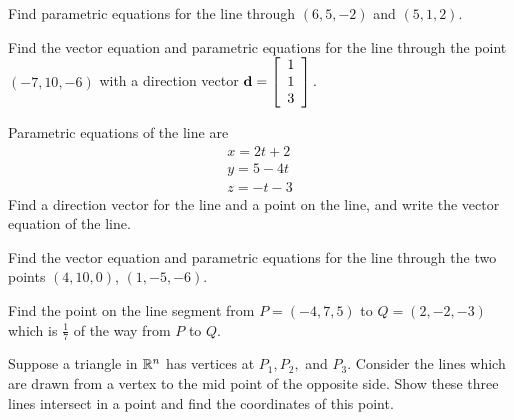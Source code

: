 \begin{enumialphparenastyle}
\begin{ex} Find parametric equations for the line through $\left( 6 , 5 , -2 \right) $ 
and $\left(5 , 1 , 2 \right) .$ 
\end{ex} 
 

\begin{ex} Find the vector equation and parametric equations for the line through the point $\left(
-7, 10 , -6 \right) $ with a direction vector ${\bf d} = \left[
\begin{array}{r}
1 \\
1 \\
3
\end{array}
\right] .$ \vspace{1mm}
\end{ex} 

\begin{ex} Parametric equations of the line are 
\begin{equation*}
\begin{array}{c}
x = 2t+2\\
y = 5-4t\\
z= -t-3
\end{array}
\end{equation*}
 Find a direction vector for the line and a point on the line, and write the 
vector equation of the line. 
\end{ex} 


\begin{ex} Find the vector equation and parametric equations for the line through the two points $\left(
4, 10, 0 \right) $, $\left( 1 , -5 , -6 \right) .$ 
\end{ex} 

\begin{ex} Find the point on the line segment from $P = \left(-4, 7, 5 \right) $
 to $Q = \left(2 , -2 , -3 \right) $ which is $\frac{1}{7}$ of the way from $P$ to $Q$.
\end{ex} 

\begin{ex} Suppose a triangle in $\mathbb{R}^{n}$  has vertices at $P_{1}, P_{2},$ and $P_{3}$. 
Consider the lines which are
drawn from a vertex to the mid point of the opposite side. Show these three
lines intersect in a point and find the coordinates of this point. 
\end{ex} 

\end{enumialphparenastyle}